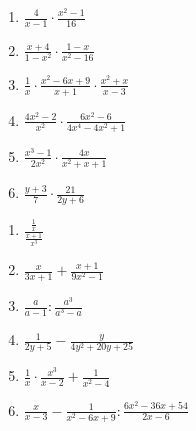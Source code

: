 \begin{description}
\begin{enumerate}[label=\thesubsection.\arabic*]
    
    \begin{multicols}{3}{\large
        \begin{enumerate} [label=\alph*)]
            \item $\frac{4}{x-1} \cdot \frac{x^2-1}{16}$
            
            \item $\frac{x+4}{1-x^2} \cdot \frac{1-x}{x^2-16}$
            
            \item $\frac{1}{x} \cdot \frac{x^2-6x+9}{x+1} \cdot \frac{x^2+x}{x-3}$
            
            \item $\frac{4x^2-2}{x^2} \cdot \frac{6x^2-6}{4x^4-4x^2+1}$
            
            \item $\frac{x^3-1}{2x^2} \cdot \frac{4x}{x^2+x+1}$
            
            \item $\frac{y+3}{7} \cdot \frac{21}{2y+6}$
        \end{enumerate}
    }\end{multicols}
    
    
    \begin{multicols}{2}{\large
        \begin{enumerate} [label=\alph*)]
            \item {\Large $\frac{\frac{1}{x}}{\frac{x+1}{x^3}}$}
            
            \item $\frac{x}{3x+1} + \frac{x+1}{9x^2-1}$
            
            \item $\frac{a}{a-1} : \frac{a^3}{a^3-a}$
            
            \item $\frac{1}{2y+5} - \frac{y}{4y^2+20y+25}$
            
            \item $\frac{1}{x} \cdot \frac{x^3}{x-2} + \frac{1}{x^2-4}$
            
            \item $\frac{x}{x-3} - \frac{1}{x^2-6x+9} : \frac{6x^2-36x+54}{2x-6}$
        \end{enumerate}
    }\end{multicols}
    
\end{enumerate}
\end{description}

